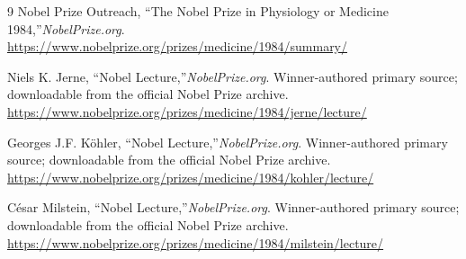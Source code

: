 \begin{thebibliography}{9}
Nobel Prize Outreach, ``The Nobel Prize in Physiology or Medicine 1984,''\emph{NobelPrize.org}.\\
\url{https://www.nobelprize.org/prizes/medicine/1984/summary/}

Niels K. Jerne, ``Nobel Lecture,''\emph{NobelPrize.org}. Winner-authored primary source; downloadable from the official Nobel Prize archive.\\
\url{https://www.nobelprize.org/prizes/medicine/1984/jerne/lecture/}

Georges J.F. K\"ohler, ``Nobel Lecture,''\emph{NobelPrize.org}. Winner-authored primary source; downloadable from the official Nobel Prize archive.\\
\url{https://www.nobelprize.org/prizes/medicine/1984/kohler/lecture/}

C\'esar Milstein, ``Nobel Lecture,''\emph{NobelPrize.org}. Winner-authored primary source; downloadable from the official Nobel Prize archive.\\
\url{https://www.nobelprize.org/prizes/medicine/1984/milstein/lecture/}
\end{thebibliography}
